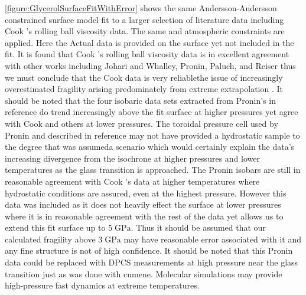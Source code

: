 \fig \nolinebreak\ref{figure:GlycerolSurfaceFitWithError} shows the same Andersson-Andersson constrained surface model fit to a larger selection of literature data including Cook \etal's rolling ball viscosity data.  The same \tgp and atmospheric constraints are applied.  Here the Actual \tgp data is provided on the surface yet not included in the fit.  It is found that Cook \etal's rolling ball viscosity data is in excellent agreement with other works including Johari and Whalley, Pronin, Paluch, and Reiser \etal thus we must conclude that the Cook \etal data is very reliable\textemdash the issue of increasingly overestimated fragility arising predominately from extreme extrapolation \nolinebreak\cite{Johari,Paluch,Pronin,Reiser}.  It should be noted that the four isobaric data sets extracted from Pronin's  in reference \nolinebreak \cite{Pronin} do trend increasingly above the fit surface at higher pressures yet agree with Cook \etal and others at lower pressures.  The toroidal pressure cell used by Pronin and described in reference \cite{Khvostantsev} may not have provided a hydrostatic sample to the degree that was assumed\textemdash a scenario which would certainly explain the data's increasing divergence from the \tgp isochrone at higher pressures and lower temperatures as the glass transition is approached.  The Pronin isobars are still in reasonable agreement with Cook \etal's data at higher temperatures where hydrostatic conditions are assured, even at the highest pressure.  However this data was included as it does not heavily effect the surface at lower pressures where it is in reasonable agreement with the rest of the data yet allows us to extend this fit surface up to $5\;\si{\giga\pascal}$.  Thus it should be assumed that our calculated fragility above $3\;\si{\giga\pascal}$ may have reasonable error associated with it and any fine structure is not of high confidence.  It should be noted that this Pronin data could be replaced with DPCS measurements at high pressure near the glass transition just as was done with cumene. Molecular simulations may provide high-pressure fast dynamics at extreme temperatures.  

